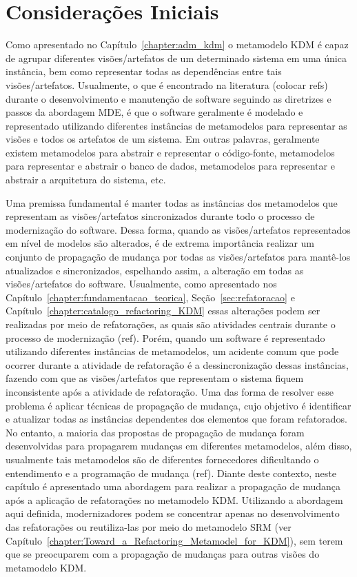 \section{Considerações Iniciais}

Como apresentado no Capítulo~\ref{chapter:adm_kdm} o metamodelo KDM é capaz de agrupar diferentes visões/artefatos de um determinado sistema em uma única instância, bem como representar todas as dependências entre tais visões/artefatos. Usualmente, o que é encontrado na literatura (colocar refs) durante o desenvolvimento e manutenção de software seguindo as diretrizes e passos da abordagem MDE, é que o software geralmente é modelado e representado utilizando diferentes instâncias de metamodelos para representar as visões e todos os artefatos de um sistema. Em outras palavras, geralmente existem metamodelos para abstrair e representar o código-fonte, metamodelos para representar e abstrair o banco de dados, metamodelos para representar e abstrair a arquitetura do sistema, etc. 

Uma premissa fundamental é manter todas as instâncias dos metamodelos que representam as visões/artefatos sincronizados durante todo o processo de modernização do software. Dessa forma, quando as visões/artefatos representados em nível de modelos são alterados, é de extrema importância realizar um conjunto de propagação de mudança por todas as visões/artefatos para mantê-los atualizados e sincronizados, espelhando assim, a alteração em todas as visões/artefatos do software. Usualmente, como apresentado nos Capítulo~\ref{chapter:fundamentacao_teorica}, Seção~\ref{sec:refatoracao} e Capítulo~\ref{chapter:catalogo_refactoring_KDM} essas alterações podem ser realizadas por meio de refatorações, as quais são atividades centrais durante o processo de modernização (ref). Porém, quando um software é representado utilizando diferentes instâncias de metamodelos, um acidente comum que pode ocorrer durante a atividade de refatoração é a dessincronização dessas instâncias, fazendo com que as visões/artefatos que representam o sistema fiquem inconsistente após a atividade de refatoração. Uma das forma de resolver esse problema é aplicar técnicas de propagação de mudança, cujo objetivo é identificar e atualizar todas as instâncias dependentes dos elementos que foram refatorados. No entanto, a maioria das propostas de propagação de mudança foram desenvolvidas para propagarem mudanças em diferentes metamodelos, além disso, usualmente tais metamodelos são de diferentes fornecedores dificultando o entendimento e a programação de mudança (ref). 
Diante deste contexto, neste capítulo é apresentado uma abordagem para realizar a propagação de mudança após a aplicação de refatorações no metamodelo KDM. Utilizando a abordagem aqui definida, modernizadores podem se concentrar apenas no desenvolvimento das refatorações ou reutiliza-las por meio do metamodelo SRM (ver Capítulo~\ref{chapter:Toward_a_Refactoring_Metamodel_for_KDM}), sem terem que se preocuparem com a propagação de mudanças para outras visões do metamodelo KDM. 

